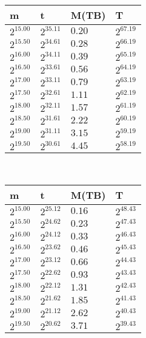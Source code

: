 \begin{tabular}{llll}
m & t & M(TB) & T \\ \hline
$2^{15.00}$ & $2^{35.11}$ & $0.20$ & $2^{67.19}$ \\
$2^{15.50}$ & $2^{34.61}$ & $0.28$ & $2^{66.19}$ \\
$2^{16.00}$ & $2^{34.11}$ & $0.39$ & $2^{65.19}$ \\
$2^{16.50}$ & $2^{33.61}$ & $0.56$ & $2^{64.19}$ \\
$2^{17.00}$ & $2^{33.11}$ & $0.79$ & $2^{63.19}$ \\
$2^{17.50}$ & $2^{32.61}$ & $1.11$ & $2^{62.19}$ \\
$2^{18.00}$ & $2^{32.11}$ & $1.57$ & $2^{61.19}$ \\
$2^{18.50}$ & $2^{31.61}$ & $2.22$ & $2^{60.19}$ \\
$2^{19.00}$ & $2^{31.11}$ & $3.15$ & $2^{59.19}$ \\
$2^{19.50}$ & $2^{30.61}$ & $4.45$ & $2^{58.19}$ \\
\end{tabular}
 \ 
\begin{tabular}{llll}
m & t & M(TB) & T \\ \hline
$2^{15.00}$ & $2^{25.12}$ & $0.16$ & $2^{48.43}$ \\
$2^{15.50}$ & $2^{24.62}$ & $0.23$ & $2^{47.43}$ \\
$2^{16.00}$ & $2^{24.12}$ & $0.33$ & $2^{46.43}$ \\
$2^{16.50}$ & $2^{23.62}$ & $0.46$ & $2^{45.43}$ \\
$2^{17.00}$ & $2^{23.12}$ & $0.66$ & $2^{44.43}$ \\
$2^{17.50}$ & $2^{22.62}$ & $0.93$ & $2^{43.43}$ \\
$2^{18.00}$ & $2^{22.12}$ & $1.31$ & $2^{42.43}$ \\
$2^{18.50}$ & $2^{21.62}$ & $1.85$ & $2^{41.43}$ \\
$2^{19.00}$ & $2^{21.12}$ & $2.62$ & $2^{40.43}$ \\
$2^{19.50}$ & $2^{20.62}$ & $3.71$ & $2^{39.43}$ \\
\end{tabular}
 \ 
